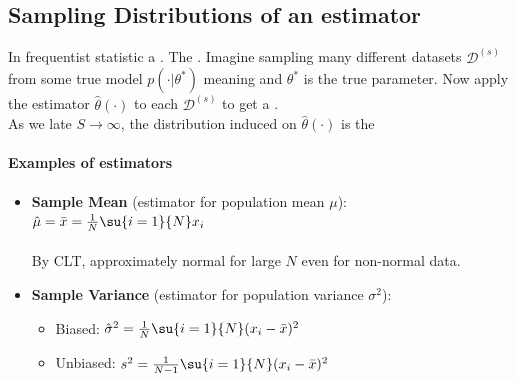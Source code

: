 \subsection{Sampling Distributions of an estimator}
In frequentist statistic a .
The . Imagine sampling many different 
datasets $\mathcal{D}^{(s)}$ from some true model 
$p(\cdot|\theta^{*})$ meaning  and $\theta^{*}$ is 
the true parameter. Now apply the estimator $\hat{\theta}(\cdot)$ to each 
$\mathcal{D}^{(s)}$ to get a .\\
As we late $S \rightarrow \infty$, the distribution induced on $\hat{\theta}(\cdot
)$ is the 

\paragraph{Examples of estimators}
\begin{itemize}
    \item \textbf{Sample Mean} (estimator for population mean $\mu$):\\
        $\hat{\mu} = \bar{x} = \frac{1}{N}\su{i=1}{N} x_i$\\
        \\
        By CLT, approximately normal for large $N$ even for non-normal data.
    \item \textbf{Sample Variance} (estimator for population variance $\sigma^2$):
        \begin{itemize}
            \item Biased: $\hat{\sigma}^2 = \frac{1}{N}\su{i=1}{N}(x_i - \bar{x})^2$
            \item Unbiased: $s^2 = \frac{1}{N-1}\su{i=1}{N}(x_i - \bar{x})^2$
        \end{itemize}
\end{itemize}

